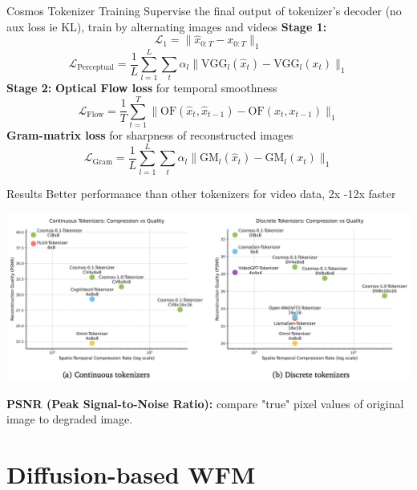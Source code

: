 \documentclass{beamer}
\begin{document}
\begin{frame}[t]{Cosmos Tokenizer Training}
    Supervise the final output of tokenizer's decoder (no aux loss ie KL), train by alternating images and videos \newline
    \textbf{Stage 1:}
    \[\mathcal{L}_1 = \| \hat{x}_{0:T} - x_{0:T} \|_1\]
    \[\mathcal{L}_{\text{Perceptual}} = \frac{1}{L} \sum_{l=1}^{L} \sum_{t} \alpha_l \| \text{VGG}_l(\hat{x}_t) - \text{VGG}_l(x_t) \|_1\]
    \textbf{Stage 2:} \newline
    \textbf{Optical Flow loss} for temporal smoothness
    \[\mathcal{L}_{\text{Flow}} = \frac{1}{T} \sum_{t=1}^{T} \| \text{OF}(\hat{x}_t, \hat{x}_{t-1}) - \text{OF}(x_t, x_{t-1}) \|_1\]    
    \textbf{Gram-matrix loss} for sharpness of reconstructed images
    \[\mathcal{L}_{\text{Gram}} = \frac{1}{L} \sum_{l=1}^{L} \sum_{t} \alpha_l \| \text{GM}_l(\hat{x}_t) - \text{GM}_l(x_t) \|_1\]
\end{frame}

\begin{frame}[t]{Results}
    Better performance than other tokenizers for video data, 2x -12x faster \newline
    \begin{center}
        \includegraphics[width=\textwidth]{./img/tokenizer_res.png}
    \end{center}
    \textbf{PSNR (Peak Signal-to-Noise Ratio):} compare "true" pixel values of original image to degraded image.
\end{frame}
\section{Diffusion-based WFM}
\end{document}
